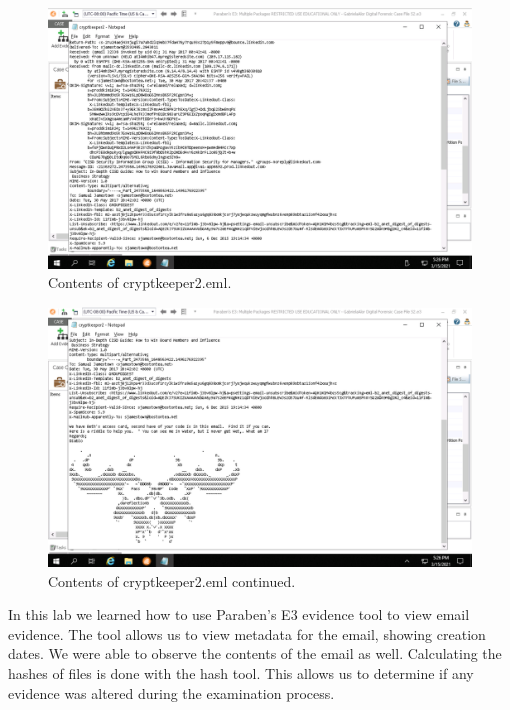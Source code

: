 \begin{figure}[H]
    \centering
    \includegraphics[width=\linewidth]{figures/2-16.png}
    \caption{Contents of cryptkeeper2.eml.}
\end{figure}

\begin{figure}[H]
    \centering
    \includegraphics[width=\linewidth]{figures/2-17.png}
    \caption{Contents of cryptkeeper2.eml continued.}
\end{figure}

In this lab we learned how to use Paraben's E3 evidence tool to view email evidence.
The tool allows us to view metadata for the email, showing creation dates.
We were able to observe the contents of the email as well.
Calculating the hashes of files is done with the hash tool.
This allows us to determine if any evidence was altered during the examination process.